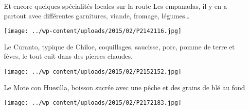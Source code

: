  Et encore quelques spécialités locales sur la route \newline
 Les empanadas, il y en a partout avec différentes garnitures, viande, fromage, légumes… \newline
 \newline
\centerline{\texttt{[image: ../wp-content/uploads/2015/02/P2142116.jpg]} } 
 \newline
 Le Curanto, typique de Chiloe, coquillages, saucisse, porc, pomme de terre et fèves, le tout cuit dans des pierres chaudes. \newline
 \newline
\centerline{\texttt{[image: ../wp-content/uploads/2015/02/P2152152.jpg]} } 
 \newline
 Le Mote con Huesilla, boisson sucrée avec une pêche et des grains de blé au fond \newline
 \newline
\centerline{\texttt{[image: ../wp-content/uploads/2015/02/P2172183.jpg]} } 
 \newline

\newpage
 
